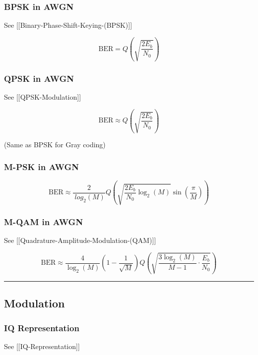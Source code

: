 \subsubsection{BPSK in AWGN}\label{bpsk-in-awgn}

See {[}{[}Binary-Phase-Shift-Keying-(BPSK){]}{]}

\[
\text{BER} = Q\left(\sqrt{\frac{2E_b}{N_0}}\right)
\]

\subsubsection{QPSK in AWGN}\label{qpsk-in-awgn}

See {[}{[}QPSK-Modulation{]}{]}

\[
\text{BER} \approx Q\left(\sqrt{\frac{2E_b}{N_0}}\right)
\]

(Same as BPSK for Gray coding)

\subsubsection{M-PSK in AWGN}\label{m-psk-in-awgn}

\[
\text{BER} \approx \frac{2}{\ log_2(M)} Q\left(\sqrt{\frac{2E_b}{N_0}\log_2(M)} \sin\left(\frac{\pi}{M}\right)\right)
\]

\subsubsection{M-QAM in AWGN}\label{m-qam-in-awgn}

See {[}{[}Quadrature-Amplitude-Modulation-(QAM){]}{]}

\[
\text{BER} \approx \frac{4}{\log_2(M)}\left(1 - \frac{1}{\sqrt{M}}\right) Q\left(\sqrt{\frac{3\log_2(M)}{M-1} \cdot \frac{E_b}{N_0}}\right)
\]

\begin{center}\rule{0.5\linewidth}{0.5pt}\end{center}

\subsection{\texorpdfstring{ Modulation}{ Modulation}}\label{modulation}

\subsubsection{IQ Representation}\label{iq-representation}

See {[}{[}IQ-Representation{]}{]}

